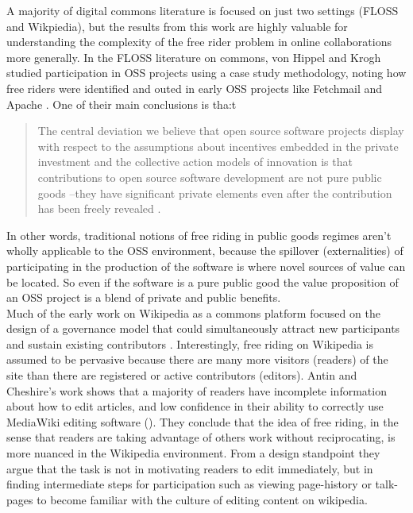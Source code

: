 \documentclass[thesis,tocnosub,noragright,centerchapter,12pt]{uiucecethesis09}
\begin{document}
A majority of digital commons literature is focused on just two settings
(FLOSS and Wikpiedia), but the results from this work are highly
valuable for understanding the complexity of the free rider problem in
online collaborations more generally. In the FLOSS literature on
commons, von Hippel and Krogh studied participation in OSS projects
using a case study methodology, noting how free riders were identified
and outed in early OSS projects like Fetchmail and Apache \citeyear{hippel2003open}. One of their
main conclusions is tha:t

\begin{quote}
The central deviation we believe that open source
software projects display with respect to the assumptions about
incentives embedded in the private investment and the collective action
models of innovation is that contributions to open source software
development are not pure public goods --they have significant private
elements even after the contribution has been freely revealed  \citep[p. 16]{hippel2003open}. 
\end{quote}

In other words, traditional notions of free riding in public
goods regimes aren't wholly applicable to the OSS environment, because
the spillover (externalities) of participating in the production of the
software is where novel sources of value can be located.
So even if the software is a pure public good the value proposition of
an OSS project is a blend of private and public benefits.\\ 

Much of the early work on Wikipedia as a commons platform focused on the design of a governance model that could
simultaneously attract new participants and sustain existing
contributors \citep[i.e.][]{nov2007motivates}. Interestingly, free riding on Wikipedia is assumed to be pervasive because there are many more visitors
(readers) of the site than there are registered or active contributors
(editors). Antin and Cheshire's work shows that a majority of readers
have incomplete information about how to edit articles, and low
confidence in their ability to correctly use MediaWiki editing software
(\citeyear{antin2010readers}). They conclude that the idea of free riding, in the sense that
readers are taking advantage of others work without reciprocating, is
more nuanced in the Wikipedia environment. From a design standpoint they
argue that the task is not in motivating readers to edit immediately,
but in finding intermediate steps for participation such as viewing page-history
 or talk-pages to become familiar with the culture of editing content on wikipedia.\\
\end{document}
